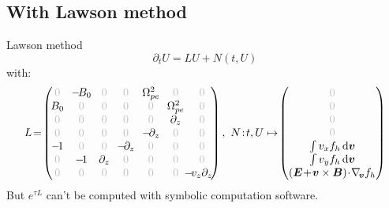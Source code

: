 \documentclass{beamer}
\newcommand{\Mvb}[1]{\boldsymbol{#1}}
\begin{document}

\newcommand{\gz}{\textcolor{gris!50}{0}}

\subsection{With Lawson method}
\begin{frame}{Lawson method}
  $$\partial_tU = LU + N(t,U)$$
  with:
  $$
    L \!=\!\begin{pmatrix}
      \gz      & \!-\!B_0\! & \gz            &  \gz              &  \!\Omega_{pe}^2\! & \gz               & \gz \\ 
      \!B_0\!  &  \gz       & \gz            &  \gz              &  \gz               & \!\Omega_{pe}^2\! & \gz \\
      \gz      &  \gz       & \gz            &  \gz              &  \gz               & \partial_z        & \gz \\ 
      \gz      &  \gz       & \gz            &  \gz              & \!-\!\partial_z\!  & \gz               & \gz \\ 
      \!-\!1\! &  \gz       & \gz            & \!-\!\partial_z\! &  \gz               & \gz               & \gz \\ 
      \gz      & \!-\!1\!   & \!\partial_z\! &  \gz              &  \gz               & \gz               & \gz \\ 
      \gz      &  \gz       & \gz            &  \gz              &  \gz               & \gz               & \!\!\!\!\!-\!v_z\partial_z\! \\ 
    \end{pmatrix}
    ,\ 
    N\!:\!t,U\mapsto\!\begin{pmatrix}
      \gz \\
      \gz \\
      \gz \\
      \gz \\
      \int v_xf_h\dd{\Mvb{v}} \\
      \int v_yf_h\dd{\Mvb{v}} \\
      (\Mvb{E}\!+\!\Mvb{v}\times\Mvb{B})\!\cdot\!\nabla_{\!\Mvb{v}}f_h
    \end{pmatrix}
  $$
  But $e^{\tau L}$ can't be computed with symbolic computation software.
\end{frame}
\end{document}
